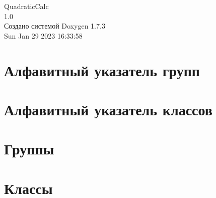 \documentclass[a4paper]{book}
\begin{document}
\hypersetup{pageanchor=false}
\begin{titlepage}
\vspace*{7cm}
\begin{center}
{\Large QuadraticCalc \\[1ex]\large 1.0 }\\
\vspace*{1cm}
{\large Создано системой Doxygen 1.7.3}\\
\vspace*{0.5cm}
{\small Sun Jan 29 2023 16:33:58}\\
\end{center}
\end{titlepage}
\clearemptydoublepage
{}
\tableofcontents
\clearemptydoublepage
{}
\hypersetup{pageanchor=true}
\chapter{Алфавитный указатель групп}

\chapter{Алфавитный указатель классов}

\chapter{Группы}





\chapter{Классы}





\printindex
\end{document}
